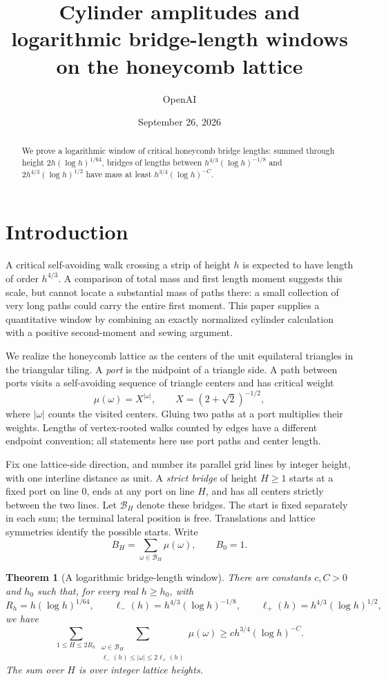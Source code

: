 \documentclass[11pt]{article}
\title{Cylinder amplitudes and logarithmic bridge-length windows on the honeycomb lattice}
\author{OpenAI}\date{September 26, 2026}
\numberwithin{equation}{section}
\newtheorem{theorem}{Theorem}[section]
\theoremstyle{definition}\newtheorem{definition}[theorem]{Definition}
\theoremstyle{remark}\newtheorem{remark}[theorem]{Remark}
\begin{document}
\begin{abstract}
We prove a logarithmic window of critical honeycomb bridge lengths: summed through height $2h(\log h)^{1/64}$, bridges of lengths between $h^{4/3}(\log h)^{-1/8}$ and $2h^{4/3}(\log h)^{1/2}$ have mass at least $h^{3/4}(\log h)^{-C}$.
\end{abstract}
\section{Introduction}
A critical self-avoiding walk crossing a strip of height $h$ is expected
to have length of order $h^{4/3}$. A comparison of total mass and first
length moment suggests this scale, but cannot locate a substantial mass
of paths there: a small collection of very long paths could carry the
entire first moment. This paper supplies a quantitative window by combining
an exactly normalized cylinder calculation with a positive second-moment
and sewing argument.

We realize the honeycomb lattice as the centers of the unit equilateral
triangles in the triangular tiling. A \emph{port} is the midpoint of a
triangle side. A path between ports visits a self-avoiding sequence of
triangle centers and has critical weight
\[
 \mu(\omega)=X^{|\omega|},\qquad X=(2+\sqrt2)^{-1/2},
\]
where $|\omega|$ counts the visited centers. Gluing two paths at a port
multiplies their weights. Lengths of vertex-rooted walks counted by edges
have a different endpoint convention; all statements here use port paths
and center length.

Fix one lattice-side direction, and number its parallel grid lines by
integer height, with one interline distance as unit. A \emph{strict bridge}
of height $H\ge1$ starts at a fixed port on line $0$, ends at any port on
line $H$, and has all centers strictly between the two lines. Let
$\mathcal B_H$ denote these bridges. The start is fixed separately in
each sum; the terminal lateral position is free. Translations and lattice
symmetries identify the possible starts. Write
\[
 B_H=\sum_{\omega\in\mathcal B_H}\mu(\omega),\qquad B_0=1.
\]

\begin{theorem}[A logarithmic bridge-length window]\label{L:thm:window}
There are constants $c,C>0$ and $h_0$ such that, for every real
$h\ge h_0$, with
\[
 R_h=h(\log h)^{1/64},\qquad
 \ell_-(h)=h^{4/3}(\log h)^{-1/8},\qquad
 \ell_+(h)=h^{4/3}(\log h)^{1/2},
\]
we have
\[
 \sum_{1\le H\le 2R_h}
 \sum_{\substack{\omega\in\mathcal B_H\\
       \ell_-(h)\le|\omega|\le2\ell_+(h)}}\mu(\omega)
 \ge c h^{3/4}(\log h)^{-C}.
\]
The sum over $H$ is over integer lattice heights.
\end{theorem}
\end{document}
